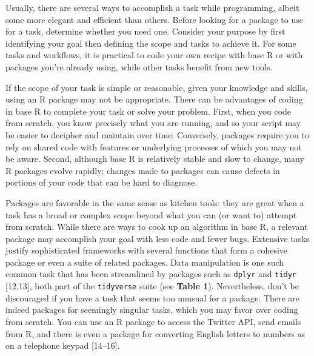 \documentclass[10pt,letterpaper]{article}
\begin{document}
Usually, there are several ways to accomplish a task while programming,
albeit some more elegant and efficient than others. Before looking for a
package to use for a task, determine whether you need one. Consider your
purpose by first identifying your goal then defining the scope and tasks
to achieve it. For some tasks and workflows, it is practical to code
your own recipe with base R or with packages you're already using, while
other tasks benefit from new tools.

If the scope of your task is simple or reasonable, given your knowledge
and skills, using an R package may not be appropriate. There can be
advantages of coding in base R to complete your task or solve your
problem. First, when you code from scratch, you know precisely what you
are running, and so your script may be easier to decipher and maintain
over time. Conversely, packages require you to rely on shared code with
features or underlying processes of which you may not be aware. Second,
although base R is relatively stable and slow to change, many R packages
evolve rapidly; changes made to packages can cause defects in portions
of your code that can be hard to diagnose.

Packages are favorable in the same sense as kitchen tools: they are
great when a task has a broad or complex scope beyond what you can (or
want to) attempt from scratch. While there are ways to cook up an
algorithm in base R, a relevant package may accomplish your goal with
less code and fewer bugs. Extensive tasks justify sophisticated
frameworks with several functions that form a cohesive package or even a
suite of related packages. Data manipulation is one such common task
that has been streamlined by packages such as \texttt{dplyr} and
\texttt{tidyr} {[}12,13{]}, both part of the \texttt{tidyverse} suite
(see \textbf{Table 1}). Nevertheless, don't be discouraged if you have a
task that seems too unusual for a package. There are indeed packages for
seemingly singular tasks, which you may favor over coding from scratch.
You can use an R package to access the Twitter API, send emails from R,
and there is even a package for converting English letters to numbers as
on a telephone keypad {[}14--16{]}.
\end{document}
